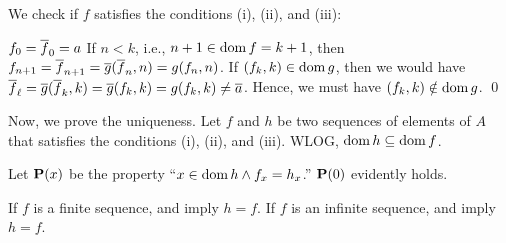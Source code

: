 \documentclass[../introduction_to_set_theory.tex]{subfiles}
\begin{document}
{{        We check if \(f\) satisfies the conditions (i), (ii), and (iii):
        \begin{enumerate}[nolistsep, label=(\roman*), leftmargin=*]
            \ii \(f_0 = \overline{f}_0 = a\)
            \ii 
            If \(n < k\), i.e., \(n + 1 \in \operatorname{dom} f = k + 1\),
            then \(f_{n+1} = \overline{f}_{n+1} = \overline g(\overline{f}_n, n) = g(f_n, n)\).
            \ii
            If \((f_k, k) \in \operatorname{dom} g\), then we would have
            \(\overline{f}_\ell = \overline g(\overline{f}_k, k) = \overline g(f_k, k) = g(f_k, k) \neq \overline{a}\).
            Hence, we must have \((f_k, k) \notin \operatorname{dom} g\). \qed
        \end{enumerate}
    }

    Now, we prove the uniqueness.
    Let \(f\) and \(h\) be two sequences of elements of \(A\)
    that satisfies the conditions (i), (ii), and (iii).
    \textsf{WLOG}, \(\operatorname{dom} h \subseteq \operatorname{dom} f\).

    Let \(\bm{\mathrm{P}}(x)\) be the property ``\(x \in \operatorname{dom} h \land f_x = h_x\).''
    \(\bm{\mathrm{P}}(0)\) evidently holds.

    If \(f\) is a finite sequence,  and 
    imply \(h = f\).
    If \(f\) is an infinite sequence,  and 
    imply \(h = f\).
}
\end{document}
